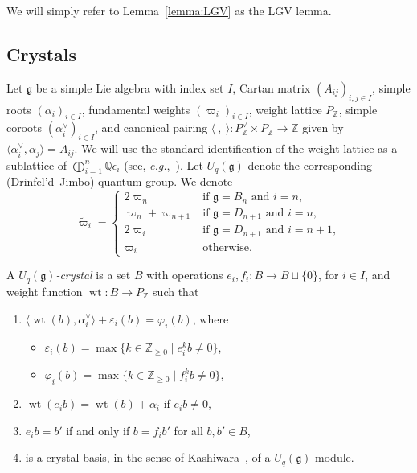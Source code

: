 \documentclass[11pt, leqno]{amsart}
\theoremstyle{plain}
\theoremstyle{definition}
\numberwithin{equation}{section}
\newcommand{\g}{\mathfrak{g}}
\newcommand{\fw}{\varpi} %
\newcommand{\tfw}{\widetilde{\fw}} %
\newcommand{\seteq}{\mathbin{:=}}
\newcommand{\Z}{\mathbb{Z}}
\newcommand{\wt}{\operatorname{wt}} %
\def\Q{\mathbb Q}
\newcommand{\defn}[1]{{\color{darkred}\emph{#1}}} %
\begin{document}
We will simply refer to Lemma~\ref{lemma:LGV} as the LGV lemma.


\subsection{Crystals}
\label{sec:crystals}

Let $\g$ be a simple Lie algebra with index set $I$, Cartan matrix $(A_{ij})_{i,j \in I}$, simple roots $(\alpha_i)_{i \in I}$, fundamental weights $(\fw_i)_{i \in I}$, weight lattice $P_{\Z}$, simple coroots $(\alpha_i^{\vee})_{i \in I}$, and canonical pairing $\langle\ ,\ \rangle \colon P_{\Z}^{\vee} \times P_{\Z} \to \Z$ given by $\langle \alpha_i^{\vee}, \alpha_j \rangle = A_{ij}$.
We will use the standard identification of the weight lattice as a sublattice of $\bigoplus_{i=1}^n \Q\epsilon_i$ (see, \textit{e.g.},~\cite{BS17}).
Let $U_q(\g)$ denote the corresponding (Drinfel'd--Jimbo) quantum group.
We denote
\[
\tfw_i = \begin{cases}
2\fw_n & \text{if $\g = B_n$ and $i = n$},
\\ \fw_n + \fw_{n+1} & \text{if $\g = D_{n+1}$ and $i = n$},
\\ 2\fw_i & \text{if $\g = D_{n+1}$ and $i = n+1$},
\\ \fw_i & \text{otherwise}.
\end{cases}
\]

A \defn{$U_q(\g)$-crystal} is a set $B$ with operations $e_i, f_i \colon B \to B \sqcup \{0\}$, for $i \in I$, and weight function $\wt \colon B \to P_{\Z}$ such that
\begin{enumerate}
\item $\langle \wt(b), \alpha_i^{\vee} \rangle + \varepsilon_i(b) = \varphi_i(b)$, where
\begin{itemize}
\item $\varepsilon_i(b) = \max \{ k \in \Z_{\geq 0} \mid e_i^k b \neq 0 \}$,
\item $\varphi_i(b) = \max \{ k \in \Z_{\geq 0} \mid f_i^k b \neq 0 \}$,
\end{itemize}
\item $\wt(e_i b) = \wt(b) + \alpha_i$ if $e_i b \neq 0$,
\item $e_i b = b'$ if and only if $b = f_i b'$ for all $b, b' \in B$,
\item is a crystal basis, in the sense of Kashiwara~\cite{K90,K91}, of a $U_q(\g)$-module.
\end{enumerate}
\end{document}
